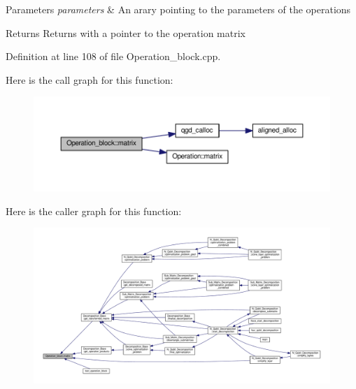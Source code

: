 \begin{DoxyParams}{Parameters}
{\em parameters} & An arary pointing to the parameters of the operations \\
\hline
\end{DoxyParams}
\begin{DoxyReturn}{Returns}
Returns with a pointer to the operation matrix 
\end{DoxyReturn}


Definition at line 108 of file Operation\+\_\+block.\+cpp.



Here is the call graph for this function\+:
\nopagebreak
\begin{figure}[H]
\begin{center}
\leavevmode
\includegraphics[width=350pt]{class_operation__block_a916db3ef5d6fcf25367843a1306cd4e0_cgraph}
\end{center}
\end{figure}




Here is the caller graph for this function\+:
\nopagebreak
\begin{figure}[H]
\begin{center}
\leavevmode
\includegraphics[width=350pt]{class_operation__block_a916db3ef5d6fcf25367843a1306cd4e0_icgraph}
\end{center}
\end{figure}


